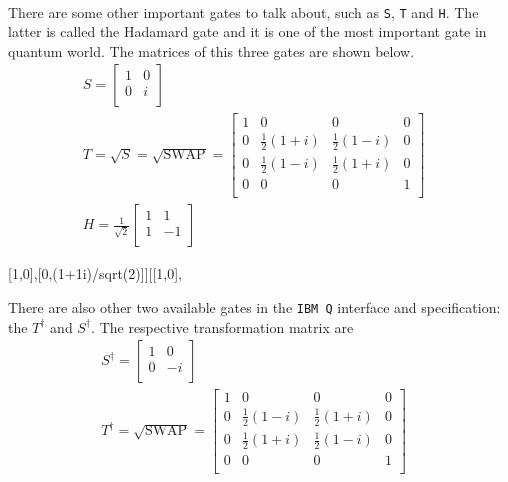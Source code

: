 \documentclass[a4paper,10pt]{article}
\begin{document}
\paragraph{} There are some other important gates to talk about, such as \texttt{S}, \texttt{T} and \texttt{H}. The latter is called the Hadamard gate and it is one of the most important gate in quantum world. The matrices of this three gates are shown below.
\begin{equation}
\begin{aligned}
S = \begin{bmatrix}
1 & 0 \\
0 & i \\
\end{bmatrix} \; \; \; \\
{\displaystyle {T} = {\sqrt {S}}={\sqrt {\mbox{SWAP}}}={\begin{bmatrix}1&0&0&0\\0&{\frac {1}{2}}(1+i)&{\frac {1}{2}}(1-i)&0\\0&{\frac {1}{2}}(1-i)&{\frac {1}{2}}(1+i)&0\\0&0&0&1\\\end{bmatrix}}} \; \; \; \\
H = \frac{1}{\sqrt{2}}\begin{bmatrix}
1 & 1 \\
1 & -1 \\
\end{bmatrix}
\end{aligned}
\label{eq:sthGates}
\end{equation}

[1,0],[0,(1+1i)/sqrt(2)]][[1,0],

There are also other two available gates in the \texttt{IBM Q} interface and specification: the $T^\dagger$ and $S^\dagger$. The respective transformation matrix are 
\begin{equation}
\begin{aligned}
S^\dagger = \begin{bmatrix}
1 & 0 \\
0 & -i \\
\end{bmatrix} \; \; \; \\
{\displaystyle {T^\dagger} = {\sqrt {\mbox{SWAP}}}={\begin{bmatrix}1&0&0&0\\0&{\frac {1}{2}}(1-i)&{\frac {1}{2}}(1+i)&0\\0&{\frac {1}{2}}(1+i)&{\frac {1}{2}}(1-i)&0\\0&0&0&1\\\end{bmatrix}}} \; \; \; \\
\end{aligned}
\label{eq:sttdGates}
\end{equation}
\end{document}
